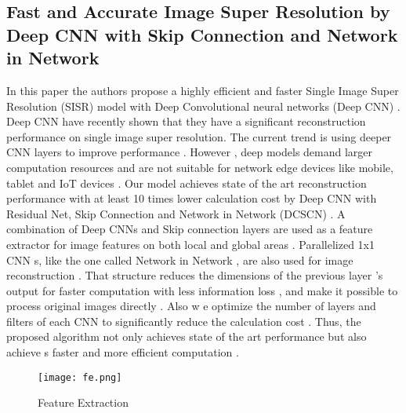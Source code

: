 \subsection{Fast and Accurate Image Super Resolution by Deep CNN with Skip Connection and Network in Network}
In this paper the authors propose a highly efficient and faster Single Image Super Resolution (SISR) model with Deep Convolutional neural networks (Deep CNN) . Deep CNN have recently shown that they have a significant reconstruction performance on single image super resolution. The current trend is using deeper CNN layers to improve performance . However , deep models demand larger computation resources and are not suitable for network edge devices like mobile, tablet and IoT devices . Our model achieves state of the art reconstruction performance with at least 10 times lower calculation cost by Deep CNN with Residual Net, Skip Connection and Network in Network (DCSCN) . A combination of Deep CNNs and Skip connection layers are used as a feature extractor for image features on both local and global areas . Parallelized 1x1 CNN s, like the one called Network in Network , are also used for image reconstruction . That structure reduces the dimensions of the previous layer ’s output for faster computation with less information loss , and make it possible to process original images directly . Also w e optimize the number of layers and filters of each CNN to significantly reduce the calculation cost . Thus, the proposed algorithm not only achieves state of the art performance but also achieve s faster and more efficient computation .

\begin{figure}[htb]
    \centering
    \texttt{[image: fe.png]}
    \caption{Feature Extraction}
    \label{fig:fe} %
\end{figure}

